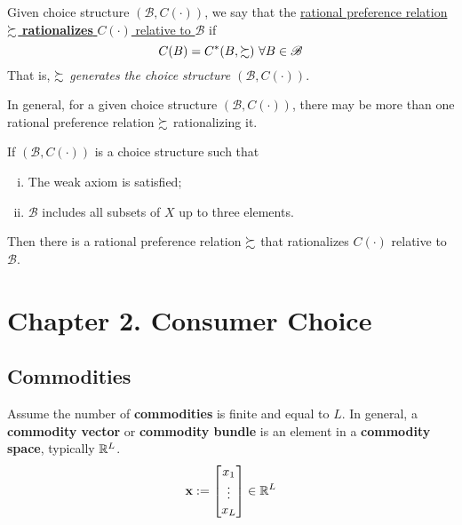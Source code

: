 \documentclass{article}
\begin{document}
		\begin{definition}[1.D.1]
			Given choice structure $(\mathscr{B}, C(\cdot))$, we say that the \ul{rational preference relation $\succsim$ \textbf{rationalizes} $C(\cdot)$ relative to $\mathscr{B}$} if
			\begin{equation}
				C(B) = C^*(B, \succsim)\ \forall B \in \mathscr{B}
			\end{equation}
			That is, \emph{$\succsim$ generates the choice structure $(\mathscr{B}, C(\cdot))$}.
		\end{definition}
		
		\begin{remark}
			In general, for a given choice structure $(\mathscr{B}, C(\cdot))$, there may be more than one rational preference relation $\succsim$ rationalizing it.
		\end{remark}
		
		\begin{proposition}
			If $(\mathscr{B}, C(\cdot))$ is a choice structure such that
			\begin{enumerate}[(i)]
				\item The weak axiom is satisfied;
				\item $\mathscr{B}$ includes all subsets of $X$ up to three elements.
			\end{enumerate}
			Then there is a rational preference relation $\succsim$ that rationalizes $C(\cdot)$ relative to $\mathscr{B}$.
		\end{proposition}
	
	\section{Chapter 2. Consumer Choice}
		\subsection{Commodities}
			\begin{definition}
				Assume the number of \textbf{commodities} is finite and equal to $L$. In general, a \textbf{commodity vector} or \textbf{commodity bundle} is an element in a \textbf{commodity space}, typically $\mathbb{R}^L$.
				\begin{equation}
					\textbf{x} := \begin{bmatrix}
						x_1 \\ \vdots \\ x_L
					\end{bmatrix} \in \mathbb{R}^L
				\end{equation}
 			\end{definition}
 			
\end{document}

